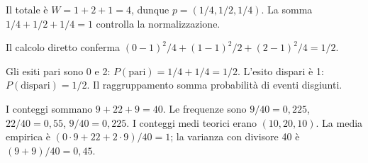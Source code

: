 \ExSolution


Il totale è \(W=1+2+1=4\), dunque \(p=(1/4,1/2,1/4)\). La somma \(1/4+1/2+1/4=1\) controlla la normalizzazione.




Il calcolo diretto conferma \((0-1)^2/4+(1-1)^2/2+(2-1)^2/4=1/2\).


Gli esiti pari sono 0 e 2: \(P(\mathrm{pari})=1/4+1/4=1/2\). L’esito dispari è 1: \(P(\mathrm{dispari})=1/2\). Il raggruppamento somma probabilità di eventi disgiunti.




I conteggi sommano \(9+22+9=40\). Le frequenze sono \(9/40=0{,}225\), \(22/40=0{,}55\), \(9/40=0{,}225\). I conteggi medi teorici erano \((10,20,10)\). La media empirica è \((0\cdot9+22+2\cdot9)/40=1\); la varianza con divisore 40 è \((9+9)/40=0{,}45\).

